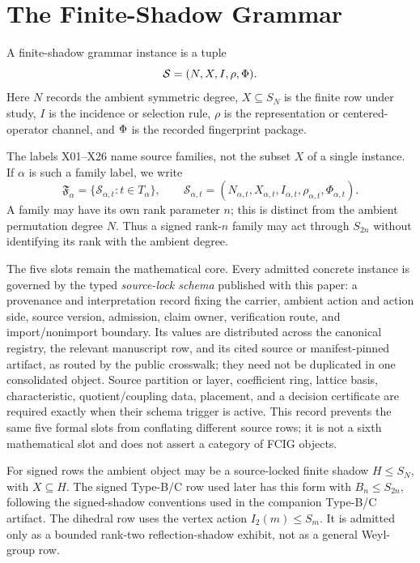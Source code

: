 \section{The Finite-Shadow Grammar}

\begin{definition}
A finite-shadow grammar instance is a tuple
\[
  \mathcal S=(N,X,I,\rho,\Phi).
\]
Here \(N\) records the ambient symmetric degree, \(X\subseteq S_N\) is the finite row under study, \(I\) is the incidence or selection rule, \(\rho\) is the representation or centered-operator channel, and \(\Phi\) is the recorded fingerprint package.
\end{definition}

The labels X01--X26 name source families, not the subset \(X\) of a single
instance.  If \(\alpha\) is such a family label, we write
\[
  \mathfrak F_\alpha
  =\{\mathcal S_{\alpha,t}:t\in T_\alpha\},
  \qquad
  \mathcal S_{\alpha,t}
  =(N_{\alpha,t},X_{\alpha,t},I_{\alpha,t},
    \rho_{\alpha,t},\Phi_{\alpha,t}).
\]
A family may have its own rank parameter \(n\); this is distinct from the
ambient permutation degree \(N\).  Thus a signed rank-\(n\) family may act
through \(S_{2n}\) without identifying its rank with the ambient degree.

The five slots remain the mathematical core.  Every admitted concrete instance
is governed by the typed \emph{source-lock schema} published with this paper:
a provenance and interpretation record fixing the carrier, ambient action and
action side, source version, admission, claim owner, verification route, and
import/nonimport boundary.  Its values are distributed across the canonical
registry, the relevant manuscript row, and its cited source or manifest-pinned
artifact, as routed by the public crosswalk; they need not be duplicated in one
consolidated object.  Source partition or layer, coefficient ring, lattice
basis, characteristic, quotient/coupling data, placement, and a decision
certificate are required exactly when their schema trigger is active.  This
record prevents the same five formal slots from conflating different source
rows; it is not a sixth mathematical slot and does not assert a category of
FCIG objects.

For signed rows the ambient object may be a source-locked finite shadow \(H\leq S_N\), with \(X\subseteq H\).  The signed Type-B/C row used later has this form with \(B_n\leq S_{2n}\), following the signed-shadow conventions used in the companion Type-B/C artifact.  The dihedral row uses the vertex action \(I_2(m)\leq S_m\).  It is admitted only as a bounded rank-two reflection-shadow exhibit, not as a general Weyl-group row.

